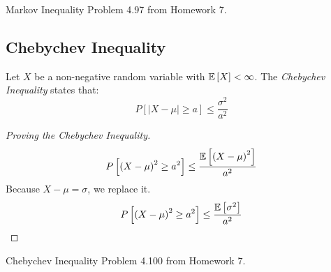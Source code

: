 		\begin{example}[Problem 4.97]{Markov Inequality}
			Problem 4.97 from Homework 7.
		\end{example}
	
	\subsection{Chebychev Inequality} \label{subsec:Chebychev Inequality}
		\begin{definition} \label{def:Chebychev Inequality}
			Let $X$ be a non-negative random variable with $\operatorname{\operatorname{\mathbb{E}}} \left[ X \right] < \infty$.
			The \emph{Chebychev Inequality} states that:
			\begin{equation} \label{eq:Chebychev Inequality}
				P \left[ \lvert X-\mu \rvert \geq a \right] \leq \frac{\sigma^{2}}{a^{2}}
			\end{equation}
			\begin{proof}[Proving the Chebychev Inequality] \label{proof:Chebychev Inequality}
				\begin{equation*}
					P \left[ \left( X-\mu \right)^{2} \geq a^{2} \right] \leq \frac{\operatorname{\operatorname{\mathbb{E}}} \left[ \left( X-\mu \right)^{2} \right]}{a^{2}}
				\end{equation*}
				Because $X-\mu = \sigma$, we replace it.
				\begin{equation*}
					P \left[ \left( X-\mu \right)^{2} \geq a^{2} \right] \leq \frac{\operatorname{\operatorname{\mathbb{E}}} \left[ \sigma^{2} \right]}{a^{2}}
				\end{equation*}
			\end{proof}
		\end{definition}
		\begin{example}[Problem 4.100]{Chebychev Inequality}
			Problem 4.100 from Homework 7.
		\end{example}